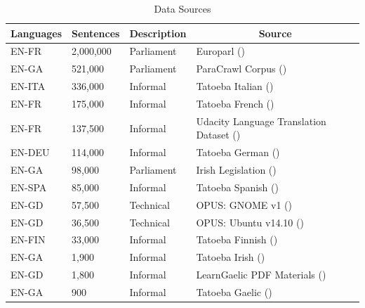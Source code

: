 \begin{table}[!ht]
\centering
\begin{tabular}{|l|l|l|l|}
\hline
\multicolumn{1}{|c|}{\textbf{Languages}} & \multicolumn{1}{c|}{\textbf{Sentences}} & \textbf{Description} & \multicolumn{1}{c|}{\textbf{Source}} \\ \hline
EN-FR   & 2,000,000     & Parliament    & Europarl (\cite{french_corpus_2005}) \\ \hline
EN-GA   & 521,000       & Parliament    & ParaCrawl Corpus (\cite{irish_paracrawl_2020}) \\ \hline
EN-ITA  & 336,000       & Informal      & Tatoeba Italian (\cite{tatoeba_data_2020}) \\ \hline
EN-FR   & 175,000       & Informal      & Tatoeba French (\cite{tatoeba_data_2020}) \\ \hline
EN-FR   & 137,500       & Informal      & Udacity Language Translation Dataset (\cite{udacity_data_2020}) \\ \hline
EN-DEU  & 114,000       & Informal      & Tatoeba German (\cite{tatoeba_data_2020}) \\ \hline
EN-GA   & 98,000        & Parliament    & Irish Legislation (\cite{irish_corpus_2017}) \\ \hline
EN-SPA  & 85,000        & Informal      & Tatoeba Spanish (\cite{tatoeba_data_2020}) \\ \hline
EN-GD   & 57,500        & Technical     & OPUS: GNOME v1 (\cite{tiedemann_opus_2012}) \\ \hline
EN-GD   & 36,500        & Technical     & OPUS: Ubuntu v14.10 (\cite{tiedemann_opus_2012}) \\ \hline
EN-FIN  & 33,000        & Informal      & Tatoeba Finnish (\cite{tatoeba_data_2020}) \\ \hline
EN-GA   & 1,900         & Informal      & Tatoeba Irish (\cite{tatoeba_data_2020}) \\ \hline
EN-GD   & 1,800         & Informal      & LearnGaelic PDF Materials (\cite{learn_gaelic_2019}) \\ \hline
EN-GA   & 900           & Informal      & Tatoeba Gaelic (\cite{tatoeba_data_2020}) \\ \hline
\end{tabular}
\captionsetup{justification=centering,font=Large}
\caption{\label{tab:available-data} Data Sources}
\end{table}

